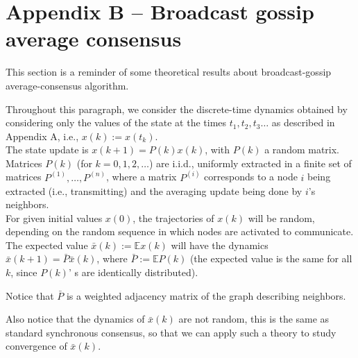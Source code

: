 \documentclass{article}
\begin{document}
\section*{Appendix B -- Broadcast gossip average consensus}

This section is a reminder of some theoretical results about broadcast-gossip average-consensus algorithm.

Throughout this paragraph, we consider the discrete-time dynamics obtained by considering only the values of the state at the times $t_1, t_2, t_3 \dots$ as described in Appendix A, i.e., $x(k) := x(t_k)$. \\

The state update is $x(k+1) = P(k) x(k)$, with $P(k)$ a random matrix. Matrices $P(k)$ (for $k=0,1,2,\dots$) are i.i.d., uniformly extracted in a finite set of matrices $P^{(1)}, \dots, P^{(n)}$,  where a matrix $P^{(i)}$ corresponds to a node $i$ being extracted (i.e., transmitting) and the averaging update being done by $i$'s neighbors.\\


For given initial values $x(0)$, the trajectories of $x(k)$  will be random, depending on the random sequence in which nodes are activated to communicate. The expected value $\bar x(k) := \mathbb E x(k)$ will have the dynamics $\bar x(k+1) = \bar P \bar x(k)$, where $\bar P := \mathbb E P(k)$ (the expected value is the same for all $k$, since $P(k)$' s are identically distributed).

Notice that $\bar P$ is a weighted adjacency matrix of the graph describing neighbors.

Also notice that the dynamics of $\bar x(k)$ are not random, this is the same as standard synchronous consensus, so that we can apply such a theory to study convergence of $\bar x(k)$.\\



\end{document}
